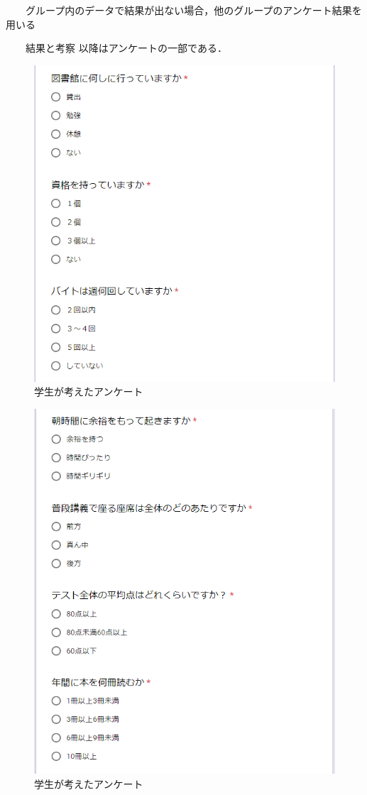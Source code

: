 　　グループ内のデータで結果が出ない場合，他のグループのアンケート結果を用いる

　　結果と考察
\nocite{ylab2015}
\newpage
以降はアンケートの一部である．
\begin{figure}[thbp]
   \includegraphics[width=13cm]{dma1.png}
   \caption{学生が考えたアンケート}
   \label{M}
\end{figure}

\newpage
\begin{figure}[thbp]
   \includegraphics[width=13cm]{dma2.png}
   \caption{学生が考えたアンケート}
   \label{M}
\end{figure}

